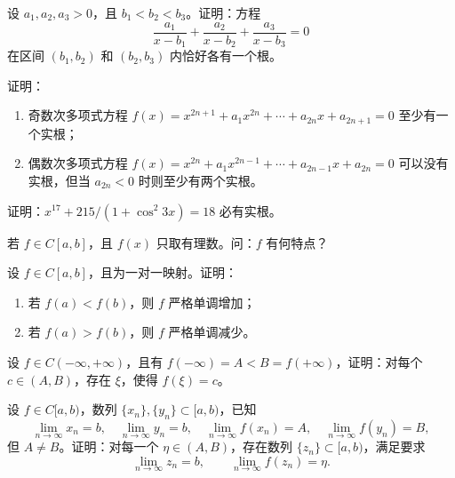 \begin{xexercise}[4]
设 $a_1,a_2,a_3>0$，且 $b_1<b_2<b_3$。证明：方程
  \[
    \frac{a_1}{x-b_1}+\frac{a_2}{x-b_2}+\frac{a_3}{x-b_3}=0
  \]
  在区间 $(b_1,b_2)$ 和 $(b_2,b_3)$ 内恰好各有一个根。
\end{xexercise}

\begin{xexercise}[5]
证明：
  \begin{enumerate}[label=(\arabic*)]
    \item 奇数次多项式方程 $f(x)=x^{2n+1}+a_1x^{2n}+\cdots+a_{2n}x+a_{2n+1}=0$ 至少有一个实根；
    \item 偶数次多项式方程 $f(x)=x^{2n}+a_1x^{2n-1}+\cdots+a_{2n-1}x+a_{2n}=0$ 可以没有实根，但当 $a_{2n}<0$ 时则至少有两个实根。
  \end{enumerate}
\end{xexercise}

\begin{xexercise}[6]
证明：$x^{17}+215/(1+\cos^2 3x)=18$ 必有实根。
\end{xexercise}

\begin{xexercise}[7]
若 $f\in C[a,b]$，且 $f(x)$ 只取有理数。问：$f$ 有何特点？
\end{xexercise}

\begin{xexercise}[8]
设 $f\in C[a,b]$，且为一对一映射。证明：
  \begin{enumerate}[label=(\arabic*)]
    \item 若 $f(a)<f(b)$，则 $f$ 严格单调增加；
    \item 若 $f(a)>f(b)$，则 $f$ 严格单调减少。
  \end{enumerate}
\end{xexercise}

\begin{xexercise}[9]
设 $f\in C(-\infty,+\infty)$，且有 $f(-\infty)=A<B=f(+\infty)$，证明：对每个 $c\in(A,B)$，存在 $\xi$，使得 $f(\xi)=c$。
\end{xexercise}

\begin{xexercise}[10]
设 $f\in C[a,b)$，数列 $\{x_n\},\{y_n\}\subset[a,b)$，已知
  \[
    \lim_{n\to\infty}x_n=b,\quad \lim_{n\to\infty}y_n=b,\quad
    \lim_{n\to\infty}f(x_n)=A,\quad \lim_{n\to\infty}f(y_n)=B,
  \]
  但 $A\ne B$。证明：对每一个 $\eta\in(A,B)$，存在数列 $\{z_n\}\subset[a,b)$，满足要求
  \[
    \lim_{n\to\infty}z_n=b,\qquad \lim_{n\to\infty}f(z_n)=\eta.
  \]
\end{xexercise}


